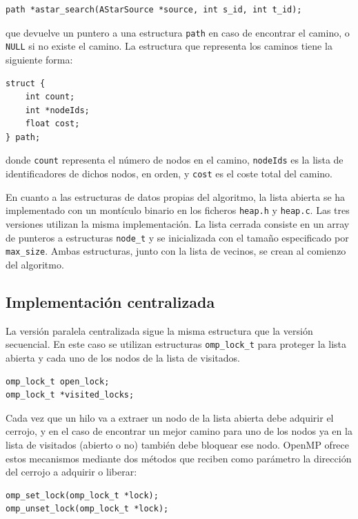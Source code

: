 \documentclass[a4paper,12pt]{article}
\begin{document}
\begin{lstlisting}
path *astar_search(AStarSource *source, int s_id, int t_id);
\end{lstlisting}

\noindent que devuelve un puntero a una estructura \verb|path| en caso de encontrar el camino, o \verb|NULL| si no existe el camino. La estructura que representa los caminos tiene la siguiente forma:

\begin{lstlisting}
struct {
    int count;
    int *nodeIds;
    float cost;
} path;
\end{lstlisting}

\noindent donde \verb|count| representa el número de nodos en el camino, \verb|nodeIds| es la lista de identificadores de dichos nodos, en orden, y \verb|cost| es el coste total del camino.

En cuanto a las estructuras de datos propias del algoritmo, la lista abierta se ha implementado con un montículo binario en los ficheros \verb|heap.h| y \verb|heap.c|. Las tres versiones utilizan la misma implementación. La lista cerrada consiste en un array de punteros a estructuras \verb|node_t| y se inicializada con el tamaño especificado por \verb|max_size|. Ambas estructuras, junto con la lista de vecinos, se crean al comienzo del algoritmo.

\subsection{Implementación centralizada}

La versión paralela centralizada sigue la misma estructura que la versión secuencial. En este caso se utilizan estructuras \verb|omp_lock_t| para proteger la lista abierta y cada uno de los nodos de la lista de visitados.

\begin{lstlisting}
omp_lock_t open_lock;
omp_lock_t *visited_locks;
\end{lstlisting}

Cada vez que un hilo va a extraer un nodo de la lista abierta debe adquirir el cerrojo, y en el caso de encontrar un mejor camino para uno de los nodos ya en la lista de visitados (abierto o no) también debe bloquear ese nodo. OpenMP ofrece estos mecanismos mediante dos métodos que reciben como parámetro la dirección del cerrojo a adquirir o liberar:

\begin{lstlisting}
omp_set_lock(omp_lock_t *lock);
omp_unset_lock(omp_lock_t *lock);
\end{lstlisting}
\end{document}
